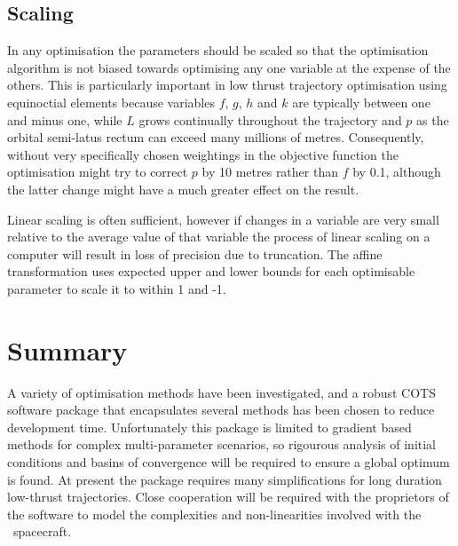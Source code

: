 \subsection{Scaling} \label{sub:Scaling}

In any optimisation the parameters should be scaled so that the optimisation algorithm is not biased towards optimising any one variable at the expense of the others. This is particularly important in low thrust trajectory optimisation using equinoctial elements because variables $f$, $g$, $h$ and $k$ are typically between one and minus one, while $L$ grows continually throughout the trajectory and $p$ as the orbital semi-latus rectum can exceed many millions of metres. Consequently, without very specifically chosen weightings in the objective function the optimisation might try to correct $p$ by 10 metres rather than $f$ by 0.1, although the latter change might have a much greater effect on the result.

Linear scaling is often sufficient, however if changes in a variable are very small relative to the average value of that variable the process of linear scaling on a computer will result in loss of precision due to truncation. The affine transformation \parencite{ASTOS_guide} uses expected upper and lower bounds for each optimisable parameter to scale it to within 1 and -1.

\section{Summary} \label{sec:Optimisation-Summary}

A variety of optimisation methods have been investigated, and a robust COTS software package that encapsulates several methods has been chosen to reduce development time. Unfortunately this package is limited to gradient based methods for complex multi-parameter scenarios, so rigourous analysis of initial conditions and basins of convergence will be required to ensure a global optimum is found. At present the package requires many simplifications for long duration low-thrust trajectories. Close cooperation will be required with the proprietors of the software to model the complexities and non-linearities involved with the \BW\ spacecraft.
 
\clearpage